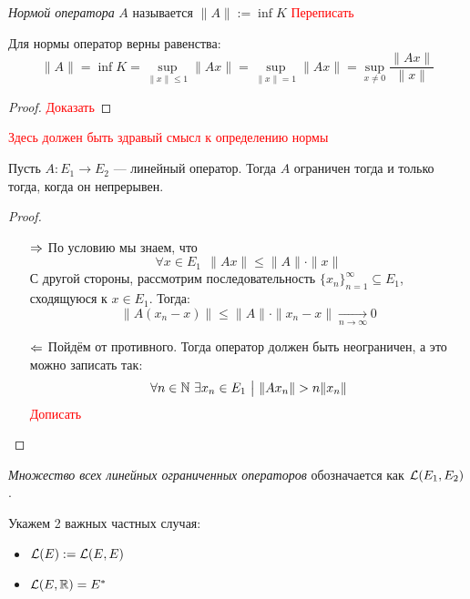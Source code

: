 \begin{definition}
	\textit{Нормой оператора} $A$ называется $\|A\| := \inf K$ \textcolor{red}{Переписать}
\end{definition}

\begin{proposition}
	Для нормы оператор верны равенства:
	\[
		\|A\| = \inf K = \sup_{\|x\| \le 1} \|Ax\| = \sup_{\|x\| = 1} \|Ax\| = \sup_{x \neq 0} \frac{\|Ax\|}{\|x\|}
	\]
\end{proposition}

\begin{proof}
	\textcolor{red}{Доказать}
\end{proof}

\textcolor{red}{Здесь должен быть здравый смысл к определению нормы}

\begin{theorem}
	Пусть $A \colon E_1 \to E_2$ --- линейный оператор. Тогда $A$ ограничен тогда и только тогда, когда он непрерывен.
\end{theorem}

\begin{proof}~
	\begin{itemize}
		\item[$\Rightarrow$] По условию мы знаем, что
		\[
			\forall x \in E_1\ \ \|Ax\| \le \|A\| \cdot \|x\|
		\]
		С другой стороны, рассмотрим последовательность $\{x_n\}_{n = 1}^\infty \subseteq E_1$, сходящуюся к $x \in E_1$. Тогда:
		\[
			\|A(x_n - x)\| \le \|A\| \cdot \|x_n - x\| \xrightarrow[n \to \infty]{} 0
		\]
		
		\item[$\Leftarrow$] Пойдём от противного. Тогда оператор должен быть неограничен, а это можно записать так:
		\[
			\forall n \in \mathbb{N}\ \exists x_n \in E_1 \ \big|\  \|Ax_n\| > n\|x_n\|
		\]
		\textcolor{red}{Дописать}
	\end{itemize}
\end{proof}

\begin{definition}
	\textit{Множество всех линейных ограниченных операторов} обозначается как $\mathcal{L}(E_1, E_2)$.
\end{definition}

\begin{note}
	Укажем 2 важных частных случая:
	\begin{itemize}
		\item $\mathcal{L}(E) := \mathcal{L}(E, E)$
		
		\item $\mathcal{L}(E, \mathbb{R}) = E^*$
	\end{itemize}
\end{note}

